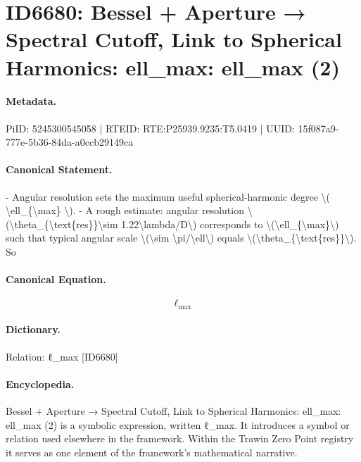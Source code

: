 \section*{ID6680: Bessel + Aperture → Spectral Cutoff, Link to Spherical Harmonics: ell\_max: ell\_max (2)}
\paragraph{Metadata.}
PiID: 5245300545058 | RTEID: RTE:P25939.9235:T5.0419 | UUID: 15f087a9-777e-5b36-84da-a0ccb29149ca

\paragraph{Canonical Statement.}
- Angular resolution sets the maximum useful spherical-harmonic degree \textbackslash{}( \textbackslash{}ell\_\{\textbackslash{}max\} \textbackslash{}). - A rough estimate: angular resolution \textbackslash{}(\textbackslash{}theta\_\{\textbackslash{}text\{res\}\}\textbackslash{}sim 1.22\textbackslash{}lambda/D\textbackslash{}) corresponds to \textbackslash{}(\textbackslash{}ell\_\{\textbackslash{}max\}\textbackslash{}) such that typical angular scale \textbackslash{}(\textbackslash{}sim \textbackslash{}pi/\textbackslash{}ell\textbackslash{}) equals \textbackslash{}(\textbackslash{}theta\_\{\textbackslash{}text\{res\}\}\textbackslash{}). So

\paragraph{Canonical Equation.}
\[
\ell_{\max}
\]

\paragraph{Dictionary.}
Relation: ℓ\_max [ID6680]

\paragraph{Encyclopedia.}
Bessel + Aperture → Spectral Cutoff, Link to Spherical Harmonics: ell\_max: ell\_max (2) is a symbolic expression, written ℓ\_max. It introduces a symbol or relation used elsewhere in the framework. Within the Trawin Zero Point registry it serves as one element of the framework's mathematical narrative.

